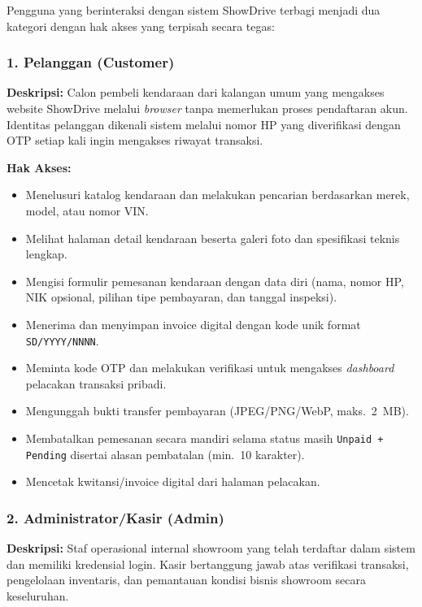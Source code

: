\documentclass[11pt, a5paper]{article}
\begin{document}
Pengguna yang berinteraksi dengan sistem ShowDrive terbagi menjadi dua kategori
dengan hak akses yang terpisah secara tegas:

\subsubsection*{1. Pelanggan (Customer)}

\textbf{Deskripsi:} Calon pembeli kendaraan dari kalangan umum yang mengakses
website ShowDrive melalui \textit{browser} tanpa memerlukan proses pendaftaran
akun. Identitas pelanggan dikenali sistem melalui nomor HP yang diverifikasi
dengan OTP setiap kali ingin mengakses riwayat transaksi.

\textbf{Hak Akses:}
\begin{itemize}
  \item Menelusuri katalog kendaraan dan melakukan pencarian berdasarkan merek,
        model, atau nomor VIN.
  \item Melihat halaman detail kendaraan beserta galeri foto dan spesifikasi
        teknis lengkap.
  \item Mengisi formulir pemesanan kendaraan dengan data diri (nama, nomor HP,
        NIK opsional, pilihan tipe pembayaran, dan tanggal inspeksi).
  \item Menerima dan menyimpan invoice digital dengan kode unik format
        \texttt{SD/YYYY/NNNN}.
  \item Meminta kode OTP dan melakukan verifikasi untuk mengakses
        \textit{dashboard} pelacakan transaksi pribadi.
  \item Mengunggah bukti transfer pembayaran (JPEG/PNG/WebP, maks.\ 2~MB).
  \item Membatalkan pemesanan secara mandiri selama status masih
        \texttt{Unpaid + Pending} disertai alasan pembatalan (min.\ 10 karakter).
  \item Mencetak kwitansi/invoice digital dari halaman pelacakan.
\end{itemize}

\subsubsection*{2. Administrator/Kasir (Admin)}

\textbf{Deskripsi:} Staf operasional internal showroom yang telah terdaftar
dalam sistem dan memiliki kredensial login. Kasir bertanggung jawab atas
verifikasi transaksi, pengelolaan inventaris, dan pemantauan kondisi bisnis
showroom secara keseluruhan.
\end{document}

